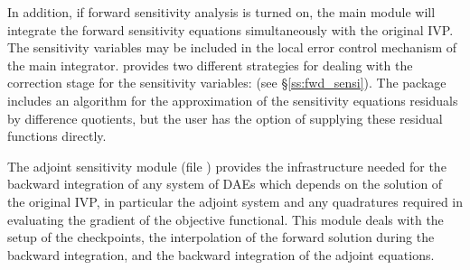 In addition, if forward sensitivity analysis is turned on, the main module 
will integrate the forward sensitivity equations simultaneously with the original
IVP. The sensitivity variables may be included in the local error control
mechanism of the main integrator.
{\idas} provides two different strategies for dealing with the correction
stage for the sensitivity variables:  
(see \S\ref{ss:fwd_sensi}).
The {\idas} package includes an algorithm for the approximation of the
sensitivity equations residuals by difference quotients, but the user has
the option of supplying these residual functions directly.

The adjoint sensitivity module (file ) provides the infrastructure needed for the 
backward integration of any system of DAEs which depends on the solution 
of the original IVP, in particular the adjoint system and any quadratures required
in evaluating the gradient of the objective functional.  This module deals with
the setup of the checkpoints, the interpolation of the forward solution during
the backward integration, and the backward integration of the adjoint equations.

